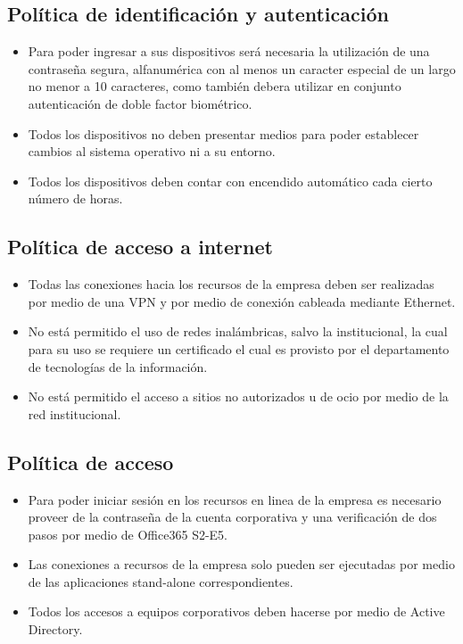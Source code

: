 \subsection{Política de identificación y autenticación}
\begin{itemize}
    \item Para poder ingresar a sus dispositivos será necesaria la utilización de una contraseña segura, alfanumérica con al menos un caracter especial de un largo no menor a 10 caracteres, como también debera utilizar en conjunto autenticación de doble factor biométrico.
    \item Todos los dispositivos no deben presentar medios para poder establecer cambios al sistema operativo ni a su entorno. 
    \item Todos los dispositivos deben contar con encendido automático cada cierto número de horas.
\end{itemize}

\subsection{Política de acceso a internet}
\begin{itemize}
    \item Todas las conexiones hacia los recursos de la empresa deben ser realizadas por medio de una VPN y por medio de conexión cableada mediante Ethernet.
    \item No está permitido el uso de redes inalámbricas, salvo la institucional, la cual para su uso se requiere un certificado el cual es provisto por el departamento de tecnologías de la información.
    \item No está permitido el acceso a sitios no autorizados u de ocio por medio de la red institucional.
\end{itemize}

\subsection{Política de acceso}
\begin{itemize}
    \item Para poder iniciar sesión en los recursos en linea de la empresa es necesario proveer de la contraseña de la cuenta corporativa y una verificación de dos pasos por medio de Office365 S2-E5.
    \item Las conexiones a recursos de la empresa solo pueden ser ejecutadas por medio de las aplicaciones stand-alone correspondientes.
    \item Todos los accesos a equipos corporativos deben hacerse por medio de Active Directory.
\end{itemize}


